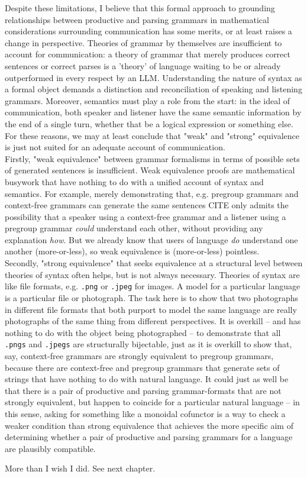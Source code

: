Despite these limitations, I believe that this formal approach to grounding relationships between productive and parsing grammars in mathematical considerations surrounding communication has some merits, or at least raises a change in perspective. Theories of grammar by themselves are insufficient to account for communication: a theory of grammar that merely produces correct sentences or correct parses is a 'theory' of language waiting to be or already outperformed in every respect by an LLM. Understanding the nature of syntax as a formal object demands a distinction and reconciliation of speaking and listening grammars. Moreover, semantics must play a role from the start: in the ideal of communication, both speaker and listener have the same semantic information by the end of a single turn, whether that be a logical expression or something else. For these reasons, we may at least conclude that "weak" and "strong" equivalence is just not suited for an adequate account of communication.\\

Firstly, "weak equivalence" between grammar formalisms in terms of possible sets of generated sentences is insufficient. Weak equivalence proofs are mathematical busywork that have nothing to do with a unified account of syntax and semantics. For example, merely demonstrating that, e.g. pregroup grammars and context-free grammars can generate the same sentences \bR CITE \e only admits the possibility that a speaker using a context-free grammar and a listener using a pregroup grammar \emph{could} understand each other, without providing any explanation \emph{how}. But we already know that users of language \emph{do} understand one another (more-or-less), so weak equivalence is (more-or-less) pointless.\\

Secondly, "strong equivalence" that seeks equivalence at a structural level between theories of syntax often helps, but is not always necessary. Theories of syntax are like file formats, e.g. \texttt{.png} or \texttt{.jpeg} for images. A model for a particular language is a particular file or photograph. The task here is to show that two photographs in different file formats that both purport to model the same language are really photographs of the same thing from different perspectives. It is overkill -- and has nothing to do with the object being photographed -- to demonstrate that all \texttt{.pngs} and \texttt{.jpegs} are structurally bijectable, just as it is overkill to show that, say, context-free grammars are strongly equivalent to pregroup grammars, because there are context-free and pregroup grammars that generate sets of strings that have nothing to do with natural language. It could just as well be that there is a pair of productive and parsing grammar-formats that are not strongly equivalent, but happen to coincide for a particular natural language -- in this sense, asking for something like a monoidal cofunctor is a way to check a weaker condition than strong equivalence that achieves the more specific aim of determining whether a pair of productive and parsing grammars for a language are plausibly compatible.

 More than I wish I did. See next chapter.